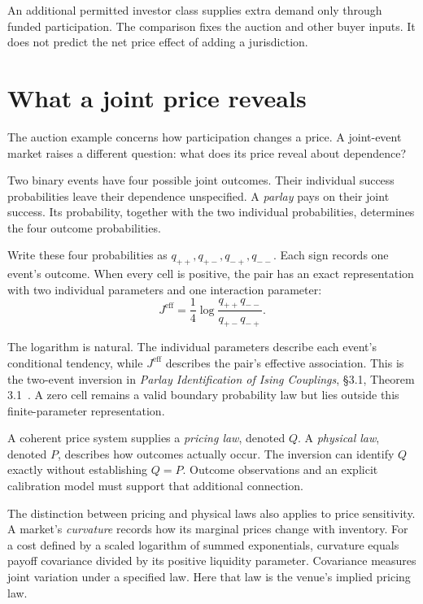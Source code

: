 \documentclass{momentum}
\begin{document}
An additional permitted investor class supplies extra demand only through funded participation. The comparison fixes the auction and other buyer inputs. It does not predict the net price effect of adding a jurisdiction.

\section{What a joint price reveals}

The auction example concerns how participation changes a price. A joint-event market raises a different question: what does its price reveal about dependence?

Two binary events have four possible joint outcomes. Their individual success probabilities leave their dependence unspecified. A \emph{parlay} pays on their joint success. Its probability, together with the two individual probabilities, determines the four outcome probabilities.

Write these four probabilities as $q_{++},q_{+-},q_{-+},q_{--}$. Each sign records one event's outcome. When every cell is positive, the pair has an exact representation with two individual parameters and one interaction parameter:
\[
J^{\mathrm{eff}}=\frac14\log
\frac{q_{++}q_{--}}{q_{+-}q_{-+}}.
\]

The logarithm is natural. The individual parameters describe each event's conditional tendency, while $J^{\mathrm{eff}}$ describes the pair's effective association. This is the two-event inversion in \emph{Parlay Identification of Ising Couplings}, \S3.1, Theorem 3.1~\cite{parlay}. A zero cell remains a valid boundary probability law but lies outside this finite-parameter representation.

A coherent price system supplies a \emph{pricing law}, denoted $Q$. A \emph{physical law}, denoted $P$, describes how outcomes actually occur. The inversion can identify $Q$ exactly without establishing $Q=P$. Outcome observations and an explicit calibration model must support that additional connection.

The distinction between pricing and physical laws also applies to price sensitivity. A market's \emph{curvature} records how its marginal prices change with inventory. For a cost defined by a scaled logarithm of summed exponentials, curvature equals payoff covariance divided by its positive liquidity parameter. Covariance measures joint variation under a specified law. Here that law is the venue's implied pricing law.
\end{document}
